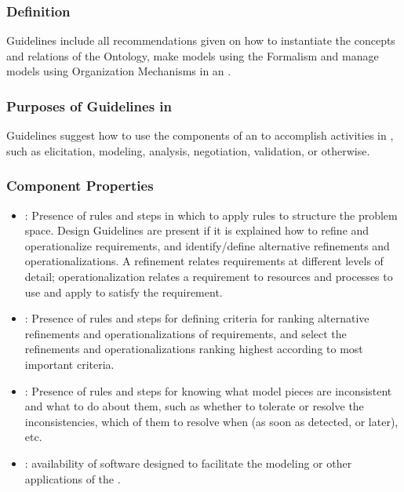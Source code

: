 \documentclass[10pt, final, conference, compsocconf]{IEEEtran}
\begin{document}
\subsubsection{Definition} 
Guidelines include all recommendations given on how to instantiate the concepts and relations of the Ontology, make models using the Formalism and manage models using Organization Mechanisms in an . 

\subsubsection{Purposes of Guidelines in }
Guidelines suggest how to use the components of an  to accomplish activities in , such as elicitation, modeling, analysis, negotiation, validation, or otherwise.

\subsubsection{Component Properties}
\begin{itemize}
\item{: Presence of rules and steps in which to apply rules to structure the problem space. Design Guidelines are present if it is explained how to refine and operationalize requirements, and identify/define alternative refinements and operationalizations. A refinement relates requirements at different levels of detail; operationalization relates a requirement to resources and processes to use and apply to satisfy the requirement.}
\item{: Presence of rules and steps for defining criteria for ranking alternative refinements and operationalizations of requirements, and select the refinements and operationalizations ranking highest according to most important criteria.}
\item{: Presence of rules and steps for knowing what model pieces are inconsistent and what to do about them, such as whether to tolerate or resolve the inconsistencies, which of them to resolve when (as soon as detected, or later), etc.}
\item{: availability of software designed to facilitate the modeling or other applications of the .}
\end{itemize}

\end{document}

